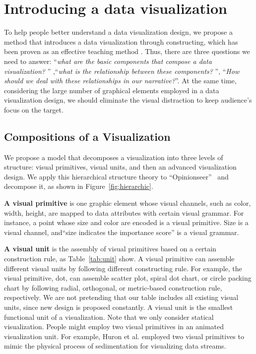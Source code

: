 \section{Introducing a data visualization} \label{analysis}
To help people better understand a data visualization design, we propose a method that introduces a data visualization through constructing, which has been proven as an effective teaching method\cite{huron_constructive_2014, chapman_constructive_1988} . Thus, there are three questions we need to answer: ``\textit{what are the basic components that compose a data visualization? }'' ,``\textit{what is the relationship between these components? }'', ``\textit{How should we deal with these relationships in our narrative?}''. At the same time, considering the large number of graphical elements employed in a data visualization design, we should eliminate the visual distraction to keep audience's focus on the target.

\subsection{Compositions of a Visualization}\label{compositions}
We propose a model that decomposes a visualization into three levels of structure: visual primitives, visual units, and then an advanced visualization design. 
We apply this hierarchical structure theory to ``Opinionseer''~\cite{wu_opinionseer:_2010} and decompose it, as shown in Figure~\ref{fig:hierarchic}. 

\noindent
\textbf{A visual primitive} is one graphic element whose visual channels, such as color, width, height, are mapped to data attributes with certain visual grammar.  For instance, a point whose size and color are encoded is a visual primitive. Size is a visual channel, and``size indicates the importance score'' is a visual grammar. 

\noindent
\textbf{A visual unit} is the assembly of visual primitives based on a certain construction rule, as Table~\ref{tab:unit} show. 
A visual primitive can assemble different visual units by following different constructing rule. For example, the visual primitive, dot, can assemble scatter plot, spiral dot chart, or circle packing chart by following radial, orthogonal, or metric-based construction rule, respectively. We are not pretending that our table includes all existing visual units, since new design is proposed constantly. A visual unit is the smallest functional unit of a visualization. Note that we only consider statical visualization. People might employ two visual primitives in an animated visualization unit. For example, Huron et al.\cite{huron_visual_2013} employed two visual primitives to mimic the physical process of sedimentation for visualizing data streams. 

